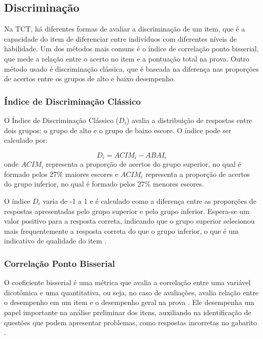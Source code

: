 \subsection{Discriminação}

Na TCT, há diferentes formas de avaliar a discriminação de um item, que é a capacidade do item de diferenciar entre indivíduos com diferentes níveis de habilidade. Um dos métodos mais comuns é o índice de correlação ponto bisserial, que mede a relação entre o acerto no item e a pontuação total na prova. Outro método usado é discriminação clássica, que é baseada na diferença nas proporções de acertos entre os grupos de alto e baixo desempenho.

\subsubsection{Índice de Discriminação Clássico}

O Índice de Discriminação Clássico ($D_i$) avalia a distribuição de respostas entre dois grupos: o grupo de alto e o grupo de baixo escore.
O índice pode ser calculado por: 

\[D_i =  ACIM_i - ABAI_i\] onde $ACIM_i$ representa a proporção de acertos do grupo superior, no qual é formado pelos 27\% maiores escores e $ACIM_i$   representa a proporção de acertos do grupo inferior, no qual é formado pelos 27\% menores escores. 

 O índice $D_i$ varia de -1 a 1 e é calculado como a diferença entre as proporções de respostas apresentadas pelo grupo superior e pelo grupo inferior. Espera-se um valor positivo para a resposta correta, indicando que o grupo superior selecionou mais frequentemente a resposta correta do que o grupo inferior, o que é um indicativo de qualidade do item  \cite{de1983consideraccoes}. 



\subsubsection{Correlação Ponto Bisserial}

O coeficiente bisserial é uma métrica que avalia a correlação entre uma variável dicotômica e uma quantitativa, ou seja, no caso de avaliações, avalia relação entre o desempenho em um item e o desempenho geral na prova \cite{BORGATTO2012}. Ele desempenha um papel importante na análise preliminar dos itens, auxiliando na identificação de questões que podem apresentar problemas, como respostas incorretas no gabarito \cite{de2000teoria}.


